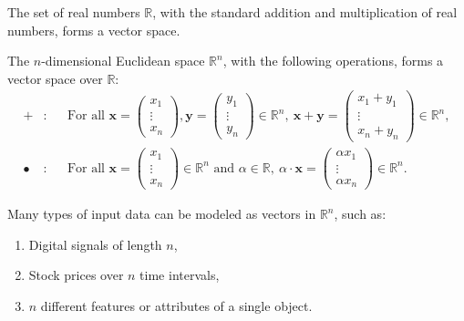 \documentclass{huhtakm-template-book-v2}
\begin{document}
    \begin{eg}
        The set of real numbers $\mathbb{R}$, with the standard addition and multiplication of real numbers, forms a vector space.
    \end{eg}
    \begin{eg}
        The $n$-dimensional Euclidean space $\mathbb{R}^{n}$, with the following operations, forms a vector space over $\mathbb{R}$:
        \begin{align*}
            +&: & &\text{For all } \mathbf{x} = \begin{pmatrix}x_{1}\\\vdots\\x_{n}\end{pmatrix}, \mathbf{y} = \begin{pmatrix}y_{1}\\\vdots\\y_{n}\end{pmatrix} \in \mathbb{R}^{n},\ \mathbf{x} + \mathbf{y} = \begin{pmatrix}x_{1} + y_{1}\\\vdots\\x_{n} + y_{n}\end{pmatrix} \in \mathbb{R}^{n},\\
            \bullet&: & &\text{For all } \mathbf{x} = \begin{pmatrix}x_{1}\\\vdots\\x_{n}\end{pmatrix} \in \mathbb{R}^{n} \text{ and } \alpha \in \mathbb{R},\ \alpha \cdot \mathbf{x} = \begin{pmatrix}\alpha x_{1}\\\vdots\\\alpha x_{n}\end{pmatrix} \in \mathbb{R}^{n}.
        \end{align*}
    \end{eg}
    \begin{rem}
        Many types of input data can be modeled as vectors in $\mathbb{R}^{n}$, such as:
        \begin{enumerate}
            \item Digital signals of length $n$,
            \item Stock prices over $n$ time intervals,
            \item $n$ different features or attributes of a single object.
        \end{enumerate}
    \end{rem}
    \newpage
    
\end{document}
